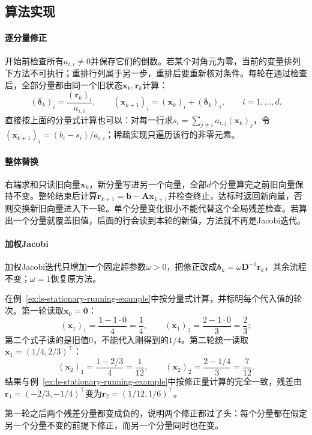 \subsection{算法实现}

\paragraph{逐分量修正}
开始前检查所有$a_{i,i}\neq0$并保存它们的倒数。若某个对角元为零，当前的变量排列下方法不可执行；重排行列属于另一步，重排后要重新核对条件。每轮在通过检查后，全部分量都由同一个旧状态$\bm x_k,\bm r_k$计算：
\[
(\bm\delta_k)_i=\frac{(\bm r_k)_i}{a_{i,i}},\qquad
(\bm x_{k+1})_i=(\bm x_k)_i+(\bm\delta_k)_i ,
\qquad i=1,\ldots,d .
\]
直接按上面的分量式计算也可以：对每一行求$s_i=\sum_{j\neq i}a_{i,j}(\bm x_k)_j$，令$(\bm x_{k+1})_i=(b_i-s_i)/a_{i,i}$；稀疏实现只遍历该行的非零元素。

\paragraph{整体替换}
右端求和只读旧向量$\bm x_k$，新分量写进另一个向量，全部$d$个分量算完之前旧向量保持不变。整轮结束后计算$\bm r_{k+1}=\bm b-\bm A\bm x_{k+1}$并检查终止，达标时返回新向量，否则交换新旧向量进入下一轮。单个分量变化很小不能代替这个全局残差检查。若算出一个分量就覆盖旧值，后面的行会读到本轮的新值，方法就不再是Jacobi迭代。

\paragraph{加权Jacobi}
加权Jacobi迭代只增加一个固定超参数$\omega>0$，把修正改成$\bm\delta_k=\omega\bm D^{-1}\bm r_k$，其余流程不变；$\omega=1$恢复原方法。

\begin{example}[Jacobi迭代的前两轮]
\label{ex:ls-jacobi-first-sweep}
在例~\ref{ex:ls-stationary-running-example}中按分量式计算，并标明每个代入值的轮次。第一轮读取$\bm x_0=\bm 0$：
\[
(\bm x_1)_1=\frac{1-1\cdot0}{4}=\frac14,\qquad
(\bm x_1)_2=\frac{2-1\cdot0}{3}=\frac23 ;
\]
第二个式子读的是旧值$0$，不能代入刚得到的$1/4$。第二轮统一读取$\bm x_1=(1/4,2/3)^\top$：
\[
(\bm x_2)_1=\frac{1-2/3}{4}=\frac1{12},\qquad
(\bm x_2)_2=\frac{2-1/4}{3}=\frac7{12}.
\]
结果与例~\ref{ex:ls-stationary-running-example}中按修正量计算的完全一致，残差由$\bm r_1=(-2/3,-1/4)^\top$变为$\bm r_2=(1/12,1/6)^\top$。

第一轮之后两个残差分量都变成负的，说明两个修正都过了头：每个分量都在假定另一个分量不变的前提下修正，而另一个分量同时也在变。
\end{example}

